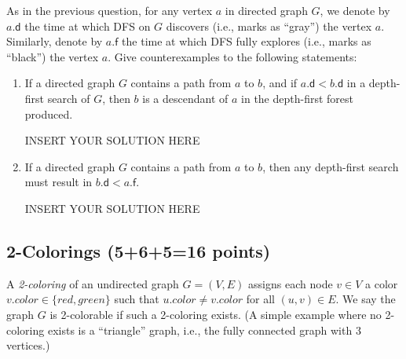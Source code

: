 \noindent
As in the previous question, for any vertex $a$ in directed graph $G$, we denote by $a.\mathsf{d} $ the time at which DFS on $G$ discovers (i.e., marks as ``gray'') the vertex $a$. Similarly, denote by $a.\mathsf{f} $ the time at which DFS fully explores (i.e., marks as ``black'') the vertex $a$. Give counterexamples to the following statements:
\begin{enumerate}[start=2]
    \item If a directed graph $G$ contains a path
    from $a$ to $b$, and if $a.\mathsf{d} < b.\mathsf{d}$ in a depth-first search of $G$, then $b$ is a descendant
    of $a$ in the depth-first forest produced.

\begin{solution}   INSERT YOUR SOLUTION HERE   \end{solution}
    \item If a directed graph $G$ contains a path
    from $a$ to $b$, then any depth-first search must result in $b.\mathsf{d} < a.\mathsf{f}$.
\begin{solution}   INSERT YOUR SOLUTION HERE   \end{solution}
\end{enumerate}


\subsection{2-Colorings (5+6+5=16 points)}
A \emph{2-coloring} of an undirected graph $G = (V,E)$ assigns each node $v \in V$ a color $v.color \in \{red,green\}$ such that $u.color \neq v.color$ for all $(u,v) \in E$. We say the graph $G$ is 
2-colorable if such a 2-coloring exists. (A simple example where no 2-coloring exists is a ``triangle'' graph, i.e., the fully connected graph with 3 vertices.)

